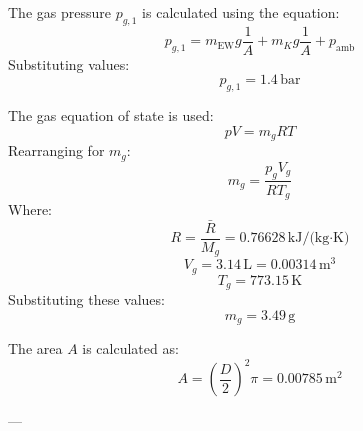 The gas pressure \( p_{g,1} \) is calculated using the equation:  
\[
p_{g,1} = m_{\text{EW}} g \frac{1}{A} + m_K g \frac{1}{A} + p_{\text{amb}}
\]  
Substituting values:  
\[
p_{g,1} = 1.4 \, \text{bar}
\]  

The gas equation of state is used:  
\[
p V = m_g R T
\]  
Rearranging for \( m_g \):  
\[
m_g = \frac{p_g V_g}{R T_g}
\]  
Where:  
\[
R = \frac{\bar{R}}{M_g} = 0.76628 \, \text{kJ/(kg·K)}
\]  
\[
V_g = 3.14 \, \text{L} = 0.00314 \, \text{m}^3
\]  
\[
T_g = 773.15 \, \text{K}
\]  
Substituting these values:  
\[
m_g = 3.49 \, \text{g}
\]  

The area \( A \) is calculated as:  
\[
A = \left( \frac{D}{2} \right)^2 \pi = 0.00785 \, \text{m}^2
\]  

---